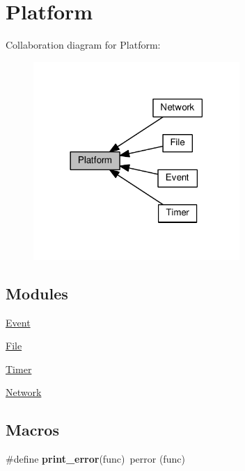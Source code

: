 \hypertarget{group__platform}{}\section{Platform}
\label{group__platform}
Collaboration diagram for Platform\+:\nopagebreak
\begin{figure}[H]
\begin{center}
\leavevmode
\includegraphics[width=222pt]{group__platform}
\end{center}
\end{figure}
\subsection*{Modules}
\begin{DoxyCompactItemize}
\item 
\hyperlink{group__event}{Event}
\item 
\hyperlink{group__file}{File}
\item 
\hyperlink{group__timer}{Timer}
\item 
\hyperlink{group__network}{Network}
\end{DoxyCompactItemize}
\subsection*{Macros}
\begin{DoxyCompactItemize}
\item 
\mbox{\label{group__platform_ga419da961b43e4e33b1084dd6566c0f45}} 
\#define {\bfseries print\+\_\+error}(func)~perror (func)
\end{DoxyCompactItemize}

